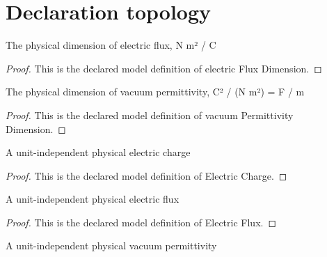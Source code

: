 \section{Declaration topology}
\begin{definition}
  \label{def:physics:phyx-mini-0848:phyxminiproblems-problemphyxmini0848-electricfluxdimension}
  The physical dimension of electric flux, N m² / C
\end{definition}
\begin{proof}
  This is the declared model definition of electric Flux Dimension.
\end{proof}
\begin{definition}
  \label{def:physics:phyx-mini-0848:phyxminiproblems-problemphyxmini0848-vacuumpermittivitydimension}
  The physical dimension of vacuum permittivity, C² / (N m²) = F / m
\end{definition}
\begin{proof}
  This is the declared model definition of vacuum Permittivity Dimension.
\end{proof}
\begin{definition}
  \label{def:physics:phyx-mini-0848:phyxminiproblems-problemphyxmini0848-electriccharge}
  A unit-independent physical electric charge
\end{definition}
\begin{proof}
  This is the declared model definition of Electric Charge.
\end{proof}
\begin{definition}
  \label{def:physics:phyx-mini-0848:phyxminiproblems-problemphyxmini0848-electricflux}
  A unit-independent physical electric flux
\end{definition}
\begin{proof}
  This is the declared model definition of Electric Flux.
\end{proof}
\begin{definition}
  \label{def:physics:phyx-mini-0848:phyxminiproblems-problemphyxmini0848-vacuumpermittivity}
  A unit-independent physical vacuum permittivity
\end{definition}

